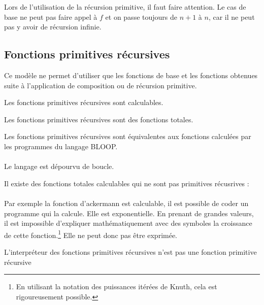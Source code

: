 \begin{myrem}
	Lors de l'utilisation de la récursion primitive, il faut faire
	attention. Le cas de base ne peut pas faire appel à $f$ et on passe
	toujours de $n+1$ à $n$, car il ne peut pas y avoir de récursion infinie.
\end{myrem}

\subsection{Fonctions primitives récursives}
Ce modèle ne permet d'utiliser que les fonctions de base et les fonctions
obtenues suite à l'application de composition ou de récursion primitive.

\begin{myprop}
	Les fonctions primitives récursives sont calculables.
\end{myprop}

\begin{myprop}
	Les fonctions primitives récursives sont des fonctions totales.
\end{myprop}

\begin{myprop}
	Les fonctions primitives récursives sont équivalentes aux fonctions calculées par les programmes du langage BLOOP.
\end{myprop}
\paragraph{} Le langage est dépourvu de boucle.

\begin{myprop}
	Il existe des fonctions totales calculables qui ne sont pas primitives récusrives :
\end{myprop}
\paragraph{} Par exemple la fonction d’ackermann est calculable, il est possible de coder un programme qui la calcule. Elle est exponentielle. En prenant de grandes valeurs, il est impossible d’expliquer mathématiquement avec des symboles la croissance de cette fonction.\footnote{
En utilisant la notation des puissances itérées de Knuth, cela est rigoureusement possible.
}
Elle ne peut donc pas être exprimée.

\begin{myprop}
	L'interpréteur des fonctions primitives récursives n'est pas une fonction primitive récursive
\end{myprop}
